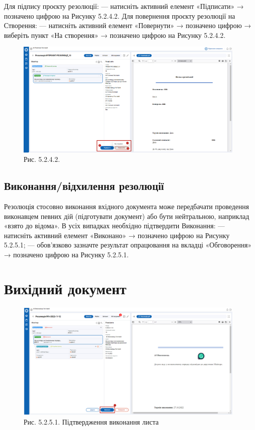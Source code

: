 Для підпису проєкту резолюції:
--- натисніть активний елемент «Підписати» → позначено цифрою  на Рисунку 5.2.4.2.
Для повернення проєкту резолюції на Створення:
--- натисніть активний елемент «Повернути» → позначено цифрою  →
виберіть пункт «На створення» → позначено цифрою  на Рисунку 5.2.4.2.

\begin{figure}[!htbp]
\centerline{\includegraphics[width=\textwidth]{img/5.2.4.2.png}}
\caption{Рис. 5.2.4.2. }
\end{figure}

\subsection{Виконання/відхилення резолюції}

Резолюція стосовно виконання вхідного документа може передбачати проведення
виконавцем певних дій (підготувати документ) або бути нейтральною, наприклад
«взято до відома». В усіх випадках необхідно підтвердити Виконання:
--- натисніть активний елемент «Виконано» → позначено цифрою  на Рисунку 5.2.5.1;
--- обов'язково зазначте результат опрацювання на вкладці «Обговорення» →
позначено цифрою  на Рисунку 5.2.5.1.

\section{Вихідний документ}

\begin{figure}[!htbp]
\centerline{\includegraphics[width=\textwidth]{img/5.2.5.1.png}}
\caption{Рис. 5.2.5.1. Підтвердження виконання листа}
\end{figure}

